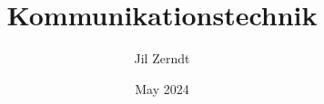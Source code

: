 \documentclass[a4paper, fontsize = 8pt, landscape]{scrartcl}
\title{Kommunikationstechnik}
\author{Jil Zerndt}
\date{May 2024}
\begin{document}
\begin{multicols*}{3}
    \thispagestyle{TitlePageStyle}
		\maketitle
    
    \raggedcolumns
    \newpage
    
    \raggedcolumns
    \newpage
    
    \raggedcolumns
    \newpage
    
    \raggedcolumns
    \newpage
    
    \raggedcolumns
    \newpage
    
    \raggedcolumns
    \newpage
    
    \raggedcolumns
    \newpage
    
    \raggedcolumns
    

\end{multicols*}
\end{document}
